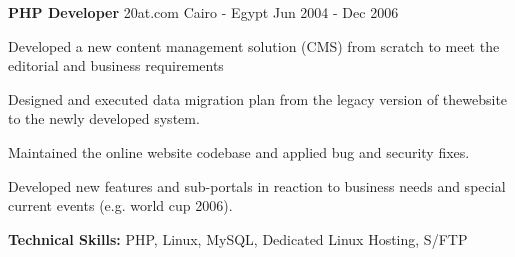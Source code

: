 \begin{cventries}
  \cventry
    {\textbf{PHP Developer}} %
    {20at.com} %
    {Cairo - Egypt} %
    {Jun 2004 - Dec 2006} %
    {
      \begin{cvitems} %
        \item {Developed a new content management solution (CMS) from scratch to meet the editorial and business requirements}
        \item {Designed and executed data migration plan from the legacy version of thewebsite to the newly developed system.}
        \item {Maintained the online website codebase and applied bug and security fixes.}
        \item {Developed new features and sub-portals in reaction to business needs and special current events (e.g. world cup
2006).}
        \item {\textbf{Technical Skills:} PHP, Linux, MySQL, Dedicated Linux Hosting, S/FTP}
      \end{cvitems}
    }
\end{cventries}
